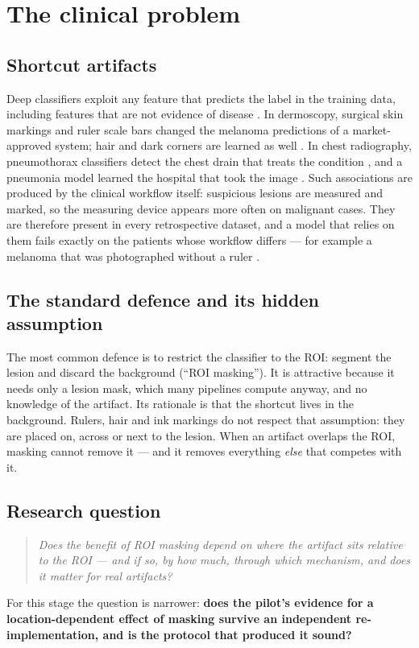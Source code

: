\section{The clinical problem}
\subsection{Shortcut artifacts}
Deep classifiers exploit any feature that predicts the label in the training data, including features that are not
evidence of disease \citep{geirhos2020shortcut,degrave2021ai}. In dermoscopy, surgical skin markings
\citep{winkler2019markings} and ruler scale bars \citep{winkler2021scalebars} changed the melanoma predictions of a
market-approved system; hair and dark corners are learned as well \citep{wang2024hair,pewton2024dca}. In chest
radiography, pneumothorax classifiers detect the chest drain that treats the condition
\citep{oakden2020hidden,jimenez2023shortcuts}, and a pneumonia model learned the hospital that took the image
\citep{zech2018variable}. Such associations are produced by the clinical workflow itself: suspicious lesions are
measured and marked, so the measuring device appears more often on malignant cases. They are therefore present in
every retrospective dataset, and a model that relies on them fails exactly on the patients whose workflow differs ---
for example a melanoma that was photographed without a ruler \citep{brown2023shortcut}.

\subsection{The standard defence and its hidden assumption}
The most common defence is to restrict the classifier to the ROI: segment the lesion and discard the background
(``ROI masking''). It is attractive because it needs only a lesion mask, which many pipelines compute anyway, and no
knowledge of the artifact. Its rationale is that the shortcut lives in the background. Rulers, hair and ink markings
do not respect that assumption: they are placed on, across or next to the lesion. When an artifact overlaps the ROI,
masking cannot remove it --- and it removes everything \emph{else} that competes with it.

\subsection{Research question}
\begin{quote}\emph{Does the benefit of ROI masking depend on where the artifact sits relative to the ROI --- and if so,
by how much, through which mechanism, and does it matter for real artifacts?}\end{quote}
For this stage the question is narrower: \textbf{does the pilot's evidence for a location-dependent effect of masking
survive an independent re-implementation, and is the protocol that produced it sound?}

